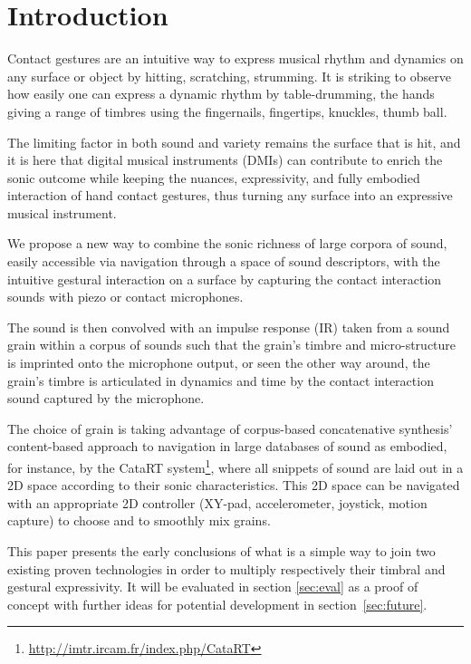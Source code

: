 \section{Introduction}


Contact gestures are an intuitive way to express musical rhythm and dynamics on any surface or object by hitting, scratching, strumming.  It is striking to observe how easily one can express a dynamic rhythm by table-drumming, the hands giving a range of timbres using the fingernails, fingertips, knuckles, thumb ball.

The limiting factor in both sound and variety remains the surface that is hit, and it is here that digital musical instruments (DMIs) can contribute to enrich the sonic outcome while keeping the nuances, expressivity, and fully embodied interaction of hand contact gestures, thus turning any surface into an expressive musical instrument.

We propose a new way to combine the sonic richness of large corpora of sound, easily accessible via navigation through a space of sound descriptors, with the intuitive gestural interaction on a surface by capturing the contact interaction sounds with piezo or contact microphones.

The sound is then convolved with an impulse response (IR) taken from a sound grain within a corpus of sounds such that the grain's timbre and micro-structure is imprinted onto the microphone output, or seen the other way around, the grain's timbre is articulated in dynamics and time by the contact interaction sound captured by the microphone. 

The choice of grain is taking advantage of corpus-based concatenative synthesis' content-based approach to navigation in large databases of sound as embodied, for instance, by the CataRT system\footnote{\url{http://imtr.ircam.fr/index.php/CataRT}}, where all snippets of sound are laid out in a 2D space according to their sonic characteristics.  This 2D space can be navigated with an appropriate 2D controller (XY-pad, accelerometer, joystick, motion capture) to choose and to smoothly mix grains.

This paper presents the early conclusions of what is a simple way to join two existing proven technologies in order to multiply respectively their timbral and gestural expressivity. It will be evaluated in section \ref{sec:eval} as a proof of concept with further ideas for potential development in section~\ref{sec:future}.


